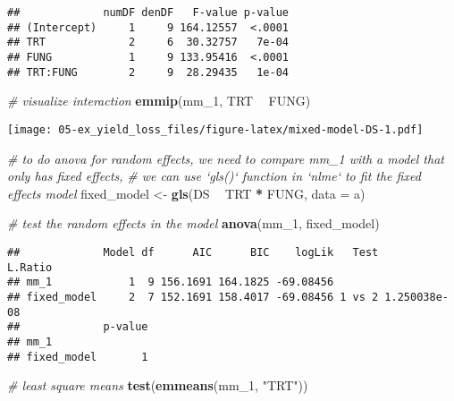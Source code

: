 \documentclass[]{book}
\newenvironment{Shaded}{\begin{snugshade}}{\end{snugshade}}
\newcommand{\CommentTok}[1]{\textcolor[rgb]{0.56,0.35,0.01}{\textit{#1}}}
\newcommand{\DataTypeTok}[1]{\textcolor[rgb]{0.13,0.29,0.53}{#1}}
\newcommand{\DecValTok}[1]{\textcolor[rgb]{0.00,0.00,0.81}{#1}}
\newcommand{\KeywordTok}[1]{\textcolor[rgb]{0.13,0.29,0.53}{\textbf{#1}}}
\newcommand{\NormalTok}[1]{#1}
\newcommand{\OperatorTok}[1]{\textcolor[rgb]{0.81,0.36,0.00}{\textbf{#1}}}
\newcommand{\StringTok}[1]{\textcolor[rgb]{0.31,0.60,0.02}{#1}}
\begin{document}
\begin{verbatim}
##             numDF denDF   F-value p-value
## (Intercept)     1     9 164.12557  <.0001
## TRT             2     6  30.32757   7e-04
## FUNG            1     9 133.95416  <.0001
## TRT:FUNG        2     9  28.29435   1e-04
\end{verbatim}

\begin{Shaded}
\begin{Highlighting}[]
\CommentTok{# visualize interaction}
\KeywordTok{emmip}\NormalTok{(mm_}\DecValTok{1}\NormalTok{, TRT }\OperatorTok{~}\StringTok{ }\NormalTok{FUNG)}
\end{Highlighting}
\end{Shaded}

\texttt{[image: 05-ex\_yield\_loss\_files/figure-latex/mixed-model-DS-1.pdf]}

\begin{Shaded}
\begin{Highlighting}[]
\CommentTok{# to do anova for random effects, we need to compare mm_1 with a model that only has fixed effects,}
\CommentTok{# we can use `gls()` function in `nlme` to fit the fixed effects model}
\NormalTok{fixed_model <-}\StringTok{ }\KeywordTok{gls}\NormalTok{(DS }\OperatorTok{~}\StringTok{ }\NormalTok{TRT }\OperatorTok{*}\StringTok{ }\NormalTok{FUNG,}
                                     \DataTypeTok{data =}\NormalTok{ a)}

\CommentTok{# test the random effects in the model}
\KeywordTok{anova}\NormalTok{(mm_}\DecValTok{1}\NormalTok{, fixed_model)}
\end{Highlighting}
\end{Shaded}

\begin{verbatim}
##             Model df      AIC      BIC    logLik   Test      L.Ratio
## mm_1            1  9 156.1691 164.1825 -69.08456                    
## fixed_model     2  7 152.1691 158.4017 -69.08456 1 vs 2 1.250038e-08
##             p-value
## mm_1               
## fixed_model       1
\end{verbatim}

\begin{Shaded}
\begin{Highlighting}[]
\CommentTok{# least square means}
\KeywordTok{test}\NormalTok{(}\KeywordTok{emmeans}\NormalTok{(mm_}\DecValTok{1}\NormalTok{, }\StringTok{"TRT"}\NormalTok{))}
\end{Highlighting}
\end{Shaded}
\end{document}
